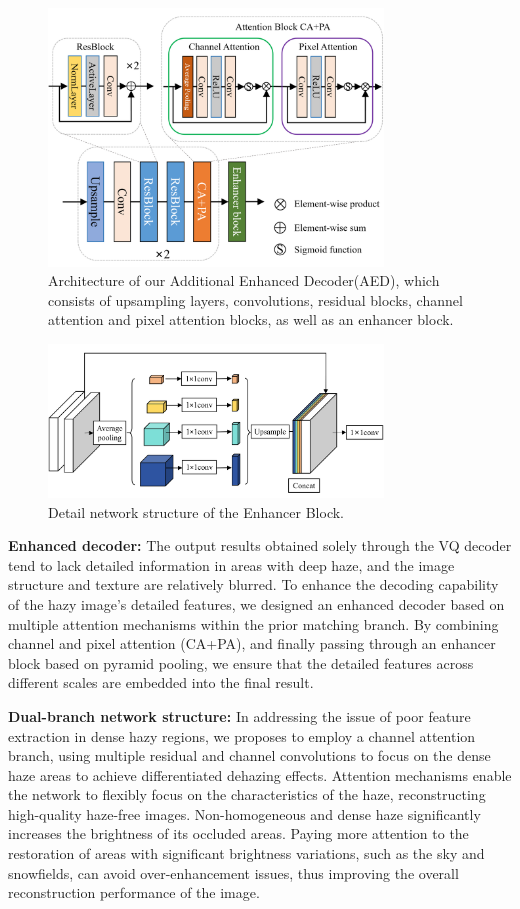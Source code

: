 \documentclass[lettersize,journal]{IEEEtran}
\begin{document}
\begin{figure}[!t]
	\centering
	\includegraphics[width=3.5in]{enhanced_decoder}
	\caption{Architecture of our Additional Enhanced Decoder(AED), which consists of upsampling layers, convolutions, residual blocks, channel attention and pixel attention blocks, as well as an enhancer block. }
	\label{fig3}
\end{figure}
\begin{figure}[!t]
	\centering
	\includegraphics[width=3.5in]{enhancer_block}
	\caption{Detail network structure of the Enhancer Block.}
	\label{fig4}
\end{figure}

{\bf{Enhanced decoder:}}
The output results obtained solely through the VQ decoder tend to lack detailed information in areas with deep haze, and the image structure and texture are relatively blurred. To enhance the decoding capability of the hazy image's detailed features, we designed an enhanced decoder based on multiple attention mechanisms within the prior matching branch. By combining channel and pixel attention (CA+PA)\cite{qin2020ffa}, and finally passing through an enhancer block\cite{qu2019enhanced} based on pyramid pooling, we ensure that the detailed features across different scales are embedded into the final result.


{\bf{Dual-branch network structure:}}
In addressing the issue of poor feature extraction in dense hazy regions, we proposes to employ a channel attention branch, using multiple residual and channel convolutions to focus on the dense haze areas to achieve differentiated dehazing effects.
Attention mechanisms enable the network to flexibly focus on the characteristics of the haze, reconstructing high-quality haze-free images. Non-homogeneous and dense haze significantly increases the brightness of its occluded areas. Paying more attention to the restoration of areas with significant brightness variations, such as the sky and snowfields, can avoid over-enhancement issues, thus improving the overall reconstruction performance of the image.
\end{document}
